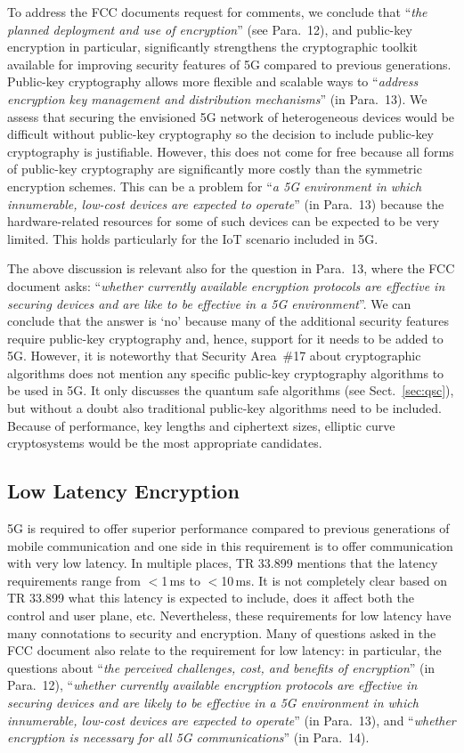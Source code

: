 \documentclass[12pt]{llncs}
\newcommand\ques[1]{``\emph{#1}''}
\begin{document}
To address the FCC documents request for comments, we conclude that \ques{the planned deployment and use of encryption} (see Para.~12), and public-key encryption in particular, significantly strengthens the cryptographic toolkit available for improving security features of 5G compared to previous generations. Public-key cryptography allows more flexible and scalable ways to \ques{address encryption key management and distribution mechanisms} (in Para.~13). We assess that securing the envisioned 5G network of heterogeneous devices would be difficult without public-key cryptography so the decision to include public-key cryptography is justifiable. However, this does not come for free because all forms of public-key cryptography are significantly more costly than the symmetric encryption schemes. This can be a problem for \ques{a 5G environment in which innumerable, low-cost devices are expected to operate} (in Para.~13) because the hardware-related resources for some of such devices can be expected to be very limited. This holds particularly for the IoT scenario included in 5G.

The above discussion is relevant also for the question in Para.~13, where the FCC document asks: \ques{whether currently available encryption protocols are effective in securing devices and are like to be effective in a 5G environment}. We can conclude that the answer  is `no' because many of the additional security features require public-key cryptography and, hence, support for it needs to be added to 5G. However, it is noteworthy that Security Area~\#17 about cryptographic algorithms does not mention any specific public-key cryptography algorithms to be used in 5G. It only discusses the quantum safe algorithms (see Sect.~\ref{sec:qsc}), but without a doubt also traditional public-key algorithms need to be included. Because of performance, key lengths and ciphertext sizes, elliptic curve cryptosystems would be the most appropriate candidates.

\subsection{Low Latency Encryption}
\label{sec:latency}

5G is required to offer superior performance compared to previous generations of mobile communication and one side in this requirement is to offer communication with very low latency. In multiple places, TR 33.899 mentions that the latency requirements range from $<$1\,ms to $<$10\,ms. It is not completely clear based on TR 33.899 what this latency is expected to include, does it affect both the control and user plane, etc. Nevertheless, these requirements for low latency have many connotations to security and encryption. Many of questions asked in the FCC document also relate to the requirement for low latency: in particular, the questions about \ques{the perceived challenges, cost, and benefits of encryption} (in Para.~12), \ques{whether currently available encryption protocols are effective in securing devices and are likely to be effective in a 5G environment in which innumerable, low-cost devices are expected to operate} (in Para.~13), and \ques{whether encryption is necessary for all 5G communications} (in Para.~14). 
\end{document}
